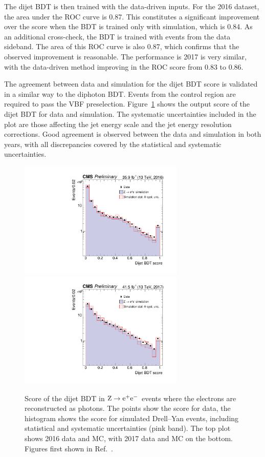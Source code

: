 The dijet BDT is then trained with the data-driven inputs.
For the 2016 dataset, the area under the ROC curve is 0.87.
This constitutes a significant improvement over the score when the BDT is trained only with simulation, 
which is 0.84.
As an additional cross-check, the BDT is trained with events from the data sideband. 
The area of this ROC curve is also 0.87, 
which confirms that the observed improvement is reasonable.
The performance is 2017 is very similar, 
with the data-driven method improving in the ROC score from 0.83 to 0.86.

The agreement between data and simulation for the dijet BDT score is validated 
in a similar way to the diphoton BDT.
Events from the \Zee control region are required to pass the VBF preselection.
Figure~\ref{fig:cat_dijetBDT} shows the output score of the dijet BDT for data and simulation.
The systematic uncertainties included in the plot are those affecting the 
jet energy scale and the jet energy resolution corrections.
Good agreement is observed between the data and simulation in both years, 
with all discrepancies covered by the statistical and systematic uncertainties.

\begin{figure}[hptb]
  \centering
  \includegraphics[width=0.7\textwidth]{Figures/Categorisation/DijetBDT_2016.pdf}
  \includegraphics[width=0.7\textwidth]{Figures/Categorisation/DijetBDT_2017.pdf}
  \caption[Validation of the dijet BDT in \Zee events.]
  {
    Score of the dijet BDT in $\mathrm{Z}\rightarrow{\mathrm{e}^{+}\mathrm{e}^{-}}$
    events where the electrons are reconstructed as photons.
    The points show the score for data, the histogram shows
    the score for simulated Drell--Yan events, including statistical and 
    systematic uncertainties (pink band).
    The top plot shows 2016 data and MC,
    with 2017 data and MC on the bottom.
    Figures first shown in Ref.~\cite{HIG-18-029}.
  }
  \label{fig:cat_dijetBDT}
\end{figure}


